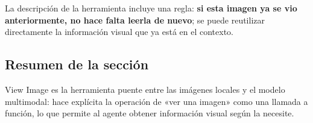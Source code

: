 La descripción de la herramienta incluye una regla: \textbf{si esta imagen ya se vio anteriormente, no hace falta leerla de nuevo}; se puede reutilizar directamente la información visual que ya está en el contexto.

\subsection{Resumen de la sección}

View Image es la herramienta puente entre las imágenes locales y el modelo multimodal: hace explícita la operación de «ver una imagen» como una llamada a función, lo que permite al agente obtener información visual según la necesite.
